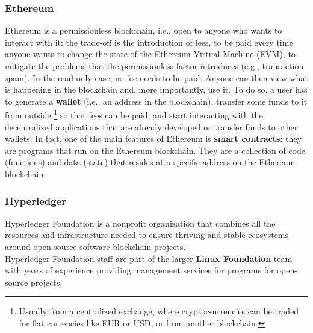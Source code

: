 \subsubsection{Ethereum}
Ethereum is a permissionless blockchain, i.e., open to anyone who wants to interact 
with it: the trade-off is the introduction of fees, to be paid every time anyone wants 
to change the state of the Ethereum Virtual Machine (EVM), to mitigate the problems 
that the permissionless factor introduces (e.g., transaction spam). In the read-only 
case, no fee needs to be paid. Anyone can then view what is happening in the blockchain 
and, more importantly, use it. To do so, a user has to generate a \textbf{wallet} (i.e.,
an address in the blockchain), transfer some funds to it from outside \footnote{Usually
from a centralized exchange, where cryptoc-urrencies can be traded for fiat currencies
like EUR or USD, or from another blockchain.} so that fees can be paid, and start 
interacting with the decentralized applications that are already developed or transfer 
funds to other wallets. In fact, one of the main features of Ethereum is \textbf{smart 
contracts}: they are programs that run on the Ethereum blockchain. They are a collection 
of code (functions) and data (state) that resides at a specific address on the 
Ethereum blockchain.
\subsubsection{Hyperledger}
Hyperledger Foundation is a nonprofit organization that combines all the resources and 
infrastructure needed to ensure thriving and stable ecosystems around open-source 
software blockchain projects.\\
Hyperledger Foundation staff are part of the larger \textbf{Linux Foundation} team with
years of experience providing management services for programs for open-source projects.
